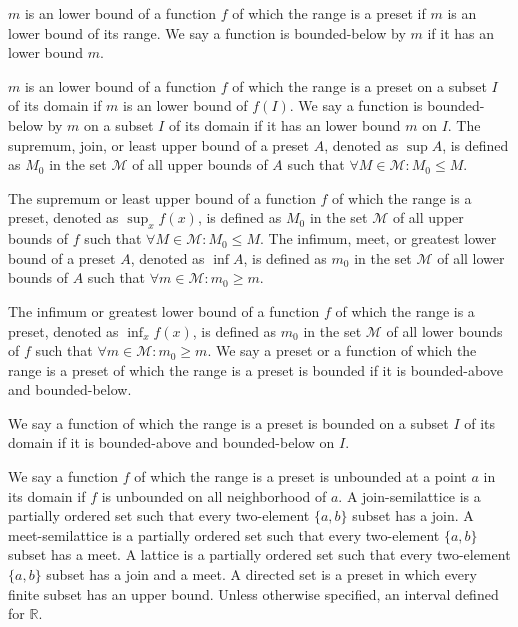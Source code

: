 \documentclass[a4paper,12pt]{article}
\begin{document}
$m$ is an lower bound of a function $f$ of which the range is a preset if $m$ is an lower bound of its range. We say a function is bounded-below by $m$ if it has an lower bound $m$.

$m$ is an lower bound of a function $f$ of which the range is a preset on a subset $I$ of its domain if $m$ is an lower bound of $f(I)$. We say a function is bounded-below by $m$ on a subset $I$ of its domain if it has an lower bound $m$ on $I$.
The supremum, join, or least upper bound of a preset $A$, denoted as $\sup A$, is defined as $M_0$ in the set $\mathcal{M}$ of all upper bounds of $A$ such that $\forall M\in\mathcal{M}\colon M_0\leq M$.

The supremum or least upper bound of a function $f$ of which the range is a preset, denoted as $\sup_xf(x)$, is defined as $M_0$ in the set $\mathcal{M}$ of all upper bounds of $f$ such that $\forall M\in\mathcal{M}\colon M_0\leq M$.
The infimum, meet, or greatest lower bound of a preset $A$, denoted as $\inf A$, is defined as $m_0$ in the set $\mathcal{M}$ of all lower bounds of $A$ such that $\forall m\in\mathcal{M}\colon m_0\geq m$.

The infimum or greatest lower bound of a function $f$ of which the range is a preset, denoted as $\inf_xf(x)$, is defined as $m_0$ in the set $\mathcal{M}$ of all lower bounds of $f$ such that $\forall m\in\mathcal{M}\colon m_0\geq m$.
We say a preset or a function of which the range is a preset of which the range is a preset is bounded if it is bounded-above and bounded-below.

We say a function of which the range is a preset is bounded on a subset $I$ of its domain if it is bounded-above and bounded-below on $I$.

We say a function $f$ of which the range is a preset is unbounded at a point $a$ in its domain if $f$ is unbounded on all neighborhood of $a$.
A join-semilattice is a partially ordered set such that every two-element $\{a,b\}$ subset has a join.
A meet-semilattice is a partially ordered set such that every two-element $\{a,b\}$ subset has a meet.
A lattice is a partially ordered set such that every two-element $\{a,b\}$ subset has a join and a meet.
A directed set is a preset in which every finite subset has an upper bound.
Unless otherwise specified, an interval defined for $\mathbb{R}$.
\end{document}

